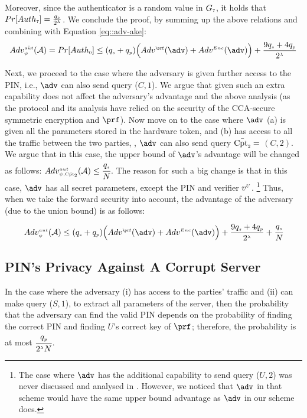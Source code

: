  Moreover, since the authenticator is a random value in $G_{\scriptscriptstyle 7}$, it holds that $Pr[Auth_{\scriptscriptstyle 7}]=\frac{q_{\scriptscriptstyle  s}}{2^{\scriptscriptstyle \lambda}}$. We conclude the proof, by summing up the above relations and combining with Equation \ref{eq::adv-ake}: 
  \begin{equation}
 Adv_{\sss \psi}^{\sss \bar {aut}}(\A) = Pr[Auth_{\sss  0}] \leq (q_{\sss s} + q_{\sss p})\Big(Adv^{\sss\prf}(\adv)+Adv^{\sss Enc}(\adv)\Big)+\frac{9q_{\sss  s}+4q_{\sss  p}}{2^{\sss \lambda}}%
 \end{equation}
 
 
Next, we proceed to the case where the adversary is given further access to the PIN, i.e., $\adv$ can also send query  \corrupt($C, 1$). We argue that given such an extra capability does not affect the adversary's advantage and the above analysis (as the protocol and its analysis have relied on the security of the CCA-secure symmetric encryption and $\prf$). Now move on to the case where $\adv$ (a) is given all the parameters stored in the hardware token, and (b) has access to all the traffic between the two parties, \ie, $\adv$ can also send query  $\bar{\text{Cpt}_{\scriptscriptstyle  2}} =$ \corrupt$(C, 2)$. We argue that in this case, the upper bound of $\adv$'s advantage will be changed as follows:  $Adv_{\scriptscriptstyle\psi, \bar{\text{Cpt}_{\scriptscriptstyle  2}}}^{\scriptscriptstyle  aut}(\mathcal{A})\leq  \cfrac{q_{\scriptscriptstyle  s}}{N}$. The reason for such a big change is that in this case, $\adv$ has all secret parameters, except the PIN and verifier ${v}^{\scriptscriptstyle U}$. \footnote{The case where $\adv$ has the additional capability to send query \corrupt($U, 2$) was never discussed and analysed in \cite{BressonCP03}. However, we noticed that $\adv$ in that scheme would have the same upper bound advantage as $\adv$ in our scheme does.} Thus, when we take the forward security into account, the advantage of the adversary (due to the union bound)  is as follows: 
%
  \begin{equation*}
 Adv_{\sss \psi}^{\sss  aut}(\A)  \leq (q_{\sss s} + q_{\sss p})\Big(Adv^{\sss\prf}(\adv)+Adv^{\sss Enc}(\adv)\Big)+\frac{9q_{\sss s}+4q_{\sss  p}}{2^{\sss \lambda}}+  \cfrac{q_{\sss  s}}{N}
 \end{equation*}


\subsection{PIN's Privacy Against A Corrupt Server} 

In the case where the adversary (i) has access to the parties' traffic and (ii) can make query \corrupt($S, 1$), to extract all parameters of the server, then the probability that the adversary can find the valid PIN depends on the probability of finding the correct PIN and finding $U$'s correct key of $\prf$; therefore, the probability is at most $\cfrac{q_{\scriptscriptstyle  p}}{2^{\scriptscriptstyle \lambda}N}$. 


